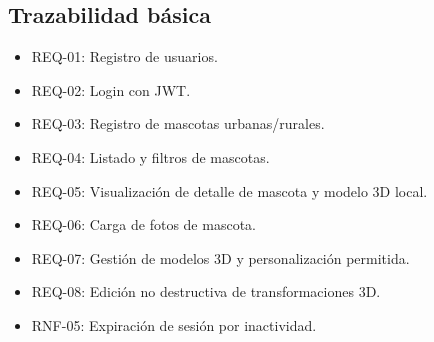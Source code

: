 \subsection{Trazabilidad b\'asica}
\begin{itemize}[leftmargin=*]
    \item REQ-01: Registro de usuarios.
    \item REQ-02: Login con JWT.
    \item REQ-03: Registro de mascotas urbanas/rurales.
    \item REQ-04: Listado y filtros de mascotas.
    \item REQ-05: Visualizaci\'on de detalle de mascota y modelo 3D local.
    \item REQ-06: Carga de fotos de mascota.
    \item REQ-07: Gesti\'on de modelos 3D y personalizaci\'on permitida.
    \item REQ-08: Edici\'on no destructiva de transformaciones 3D.
    \item RNF-05: Expiraci\'on de sesi\'on por inactividad.
\end{itemize}
